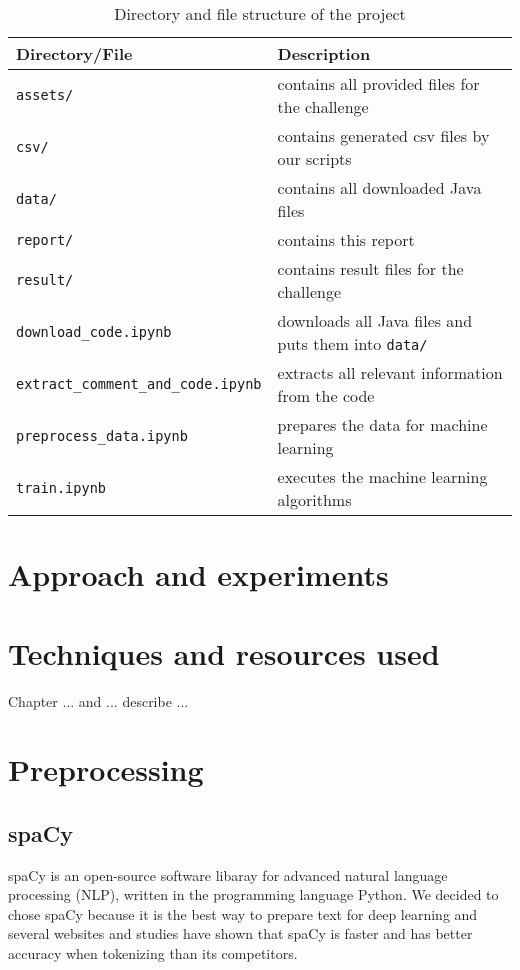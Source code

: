 \documentclass[runningheads]{llncs}
\begin{document}
\begin{table}[]
\centering
\begin{tabular}{|l|l|}
\hline
\rowcolor[HTML]{C0C0C0} 
\textbf{Directory/File} & \textbf{Description} \\ \hline
\texttt{assets/} & contains all provided files for the challenge \\ \hline
\texttt{csv/} & contains generated csv files by our scripts \\ \hline
\texttt{data/} & contains all downloaded Java files \\ \hline
\texttt{report/} & contains this report \\ \hline
\texttt{result/} & contains result files for the challenge \\ \hline
\texttt{download\_code.ipynb} & downloads all Java files and puts them into \texttt{data/} \\ \hline
\texttt{extract\_comment\_and\_code.ipynb} & extracts all relevant information from the code \\ \hline
\texttt{preprocess\_data.ipynb} & prepares the data for machine learning \\ \hline
\texttt{train.ipynb} & executes the machine learning algorithms \\ \hline
\end{tabular}
\caption{Directory and file structure of the project}
\label{tab:structure}
\end{table}


\section{Approach and experiments}


\section{Techniques and resources used}
Chapter ... and ... describe ...


\section{Preprocessing}

\subsection{spaCy}
spaCy \cite{ref_spacy} is an open-source software libaray for advanced natural language processing (NLP), written in the programming language Python.
We decided to chose spaCy because it is the best way to prepare text for deep learning \cite{ref_spacy_facts} and several websites and studies \cite{ref_choi} have shown that spaCy is faster and has better accuracy when tokenizing than its competitors.
\end{document}
